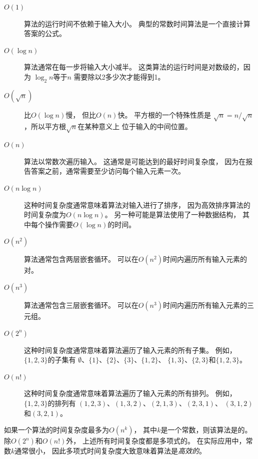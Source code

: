 \begin{description}
\item[$O(1)$]
算法的运行时间不依赖于输入大小。
典型的常数时间算法是一个直接计算答案的公式。

\item[$O(\log n)$]
算法通常在每一步将输入大小减半。
这类算法的运行时间是对数级的，因为
$\log_2 n$等于$n$
需要除以2多少次才能得到1。

\item[$O(\sqrt n)$]
比$O(\log n)$慢，
但比$O(n)$快。
平方根的一个特殊性质是
$\sqrt n = n/\sqrt n$，所以平方根$\sqrt n$在某种意义上
位于输入的中间位置。

\item[$O(n)$]
算法以常数次遍历输入。
这通常是可能达到的最好时间复杂度，
因为在报告答案之前，通常需要至少访问每个输入元素一次。

\item[$O(n \log n)$]
这种时间复杂度通常意味着算法对输入进行了排序，
因为高效排序算法的时间复杂度为$O(n \log n)$。
另一种可能是算法使用了一种数据结构，
其中每个操作需要$O(\log n)$的时间。

\item[$O(n^2)$]
算法通常包含两层嵌套循环。
可以在$O(n^2)$时间内遍历所有输入元素的对。

\item[$O(n^3)$]
算法通常包含三层嵌套循环。
可以在$O(n^3)$时间内遍历所有输入元素的三元组。

\item[$O(2^n)$]
这种时间复杂度通常意味着算法遍历了输入元素的所有子集。
例如，$\{1,2,3\}$的子集有
$\emptyset$、$\{1\}$、$\{2\}$、$\{3\}$、$\{1,2\}$、
$\{1,3\}$、$\{2,3\}$和$\{1,2,3\}$。

\item[$O(n!)$]
这种时间复杂度通常意味着算法遍历了输入元素的所有排列。
例如，$\{1,2,3\}$的排列有
$(1,2,3)$、$(1,3,2)$、$(2,1,3)$、$(2,3,1)$、
$(3,1,2)$和$(3,2,1)$。

\end{description}

如果一个算法的时间复杂度最多为$O(n^k)$，
其中$k$是一个常数，则该算法是的。
除$O(2^n)$和$O(n!)$外，
上述所有时间复杂度都是多项式的。
在实际应用中，常数$k$通常很小，
因此多项式时间复杂度大致意味着算法是\emph{高效的}。



